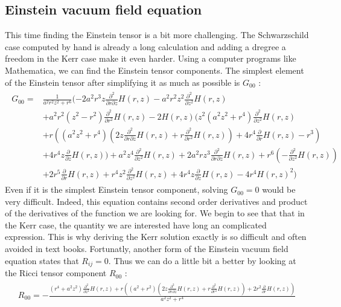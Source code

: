 \documentclass[a4paper,12pt]{article}
\theoremstyle{definition}
\begin{document}
\subsection{Einstein vacuum field equation}
This time finding the Einstein tensor is a bit more challenging.
The Schwarzschild case computed by hand is already a long calculation and adding a dregree a freedom in the Kerr case make it even harder.
Using a computer programs like Mathematica, we can find the Einstein tensor components.
The simplest element of the Einstein tensor after simplifying it as much as possible is $G_{00}$ :
\begin{align}
\begin{split}
	G_{00} = &\frac{1}{a^2 r^2z^2+r^6}(-2 a^2 r^3 z \frac{\partial^2}{\partial r\partial z}H(r,z)-a^2 r^2 z^2 \frac{\partial^2}{\partial z^2}H(r,z)\\&+a^2 r^2(z^2-r^2) \frac{\partial^2}{\partial r^2}H(r,z)
	-2 H(r,z) (z^2 (a^2z^2+r^4) \frac{\partial^2}{\partial z^2}H(r,z)\\&+r ((a^2 z^2+r^4)(2 z \frac{\partial^2}{\partial r\partial z}H(r,z)+r \frac{\partial^2}{\partial r^2}H(r,z))
	+4r^4\frac{\partial}{\partial r}H(r,z)-r^3)\\&+4 r^4 z \frac{\partial}{\partial z}H(r,z))+a^2 z^4\frac{\partial^2}{\partial z^2}H(r,z)+2 a^2 r z^3 \frac{\partial^2}{\partial r\partial z}H(r,z)
	+r^6(-\frac{\partial^2}{\partial z^2}H(r,z))\\&+2 r^5 \frac{\partial}{\partial r}H(r,z)+r^4 z^2\frac{\partial^2}{\partial z^2}H(r,z)+4 r^4 z \frac{\partial}{\partial z}H(r,z)-4 r^4 H(r,z)^2)
\end{split}
\end{align}
Even if it is the simplest Einstein tensor component, solving $G_{00}=0$ would be very difficult.
Indeed, this equation contains second order derivatives and product of the derivatives of the function we are looking for.
We begin to see that that in the Kerr case, the quantity we are interested have long an complicated expression.
This is why deriving the Kerr solution exactly is so difficult and often avoided in text books.
Fortunatly, another form of the Einstein vacuum field equation states that $R_{ij}=0$.
Thus we can do a little bit a better by looking at the Ricci tensor component $R_{00}$ :
\begin{align}
\begin{split}
	R_{00}=-\frac{(r^4+a^2z^2)\frac{\partial^2}{\partial z^2}H(r,z)+r
	((a^2+r^2) (2 z \frac{\partial^2}{\partial r\partial z}H(r,z)+r
	\frac{\partial^2}{\partial r^2}H(r,z))+2 r^2 \frac{\partial}{\partial r}H(r,z))}{a^2 z^2+r^4}
\end{split}
\end{align}
\end{document}
